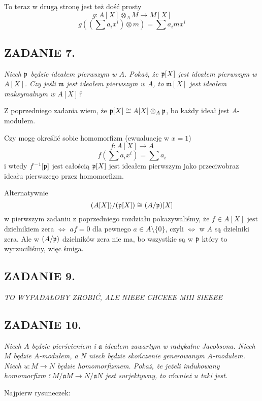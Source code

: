 \documentclass{article}
\begin{document}
To teraz w drugą stronę jest też dość prosty
$$g:A[X]\otimes_AM\to M[X]$$
$$g(\left(\sum a_ix^i\right)\otimes m)=\sum a_imx^i$$

\subsection*{ZADANIE 7.}
{\color{yellow}\emph{Niech $\mathfrak{p}$ będzie ideałem pierwszym w $A$. Pokaż, że $\mathfrak{p}[X]$ jest ideałem pierwszym w $A[X]$. Czy jeśli $\mathfrak{m}$ jest ideałem pierwszym w $A$, to $\mathfrak{m}[X]$ jest ideałem maksymalnym w $A[X]$?}}
\smallskip

Z poprzedniego zadania wiem, że $\mathfrak{p}[X]\cong A[X]\otimes_A\mathfrak{p}$, bo każdy ideał jest $A$-modułem.

Czy mogę określić sobie homomorfizm (ewualuację w $x=1$)
$$f:A[X]\to A$$
$$f(\sum a_ix^i)=\sum a_i$$
i wtedy $f^{-1}[\mathfrak{p}]$ jest całością $\mathfrak{p}[X]$ jest ideałem pierwszym jako przeciwobraz ideału pierwszego przez homomorfizm. 

Alternatywnie
$$(A[X])/(\mathfrak{p}[X])\cong (A/\mathfrak{p})[X]$$
w pierwszym zadaniu z poprzedniego rozdziału pokazywaliśmy, że $f\in A[X]$ jest dzielnikiem zera $\iff$ $af=0$ dla pewnego $a\in A\setminus\{0\}$,
czyli $\iff$ w $A$ są dzielniki zera.
Ale w $(A/\mathfrak{p})$ dzielników zera nie ma, bo wszystkie są w $\mathfrak{p}$ który to wyrzuciliśmy, więc śmiga.

\subsection*{ZADANIE 9.}
\emph{\color{yellow}TO WYPADAŁOBY ZROBIĆ, ALE NIEEE CHCEEE MIII SIEEEE}



\subsection*{ZADANIE 10.}
\emph{\color{blue}Niech $A$ będzie pierścieniem i $\mathfrak{a}$ ideałem zawartym w radykalne Jacobsona. Niech $M$ będzie $A$-modułem, a $N$ niech będzie skończenie generowanym $A$-modułem. Niech $u:M\to N$ będzie homomorfizmem. Pokaż, że jeżeli indukowany homomorfizm $\overline:M/\mathfrak{a}M\to N/\mathfrak{a}N$ jest surjektywny, to również $u$ taki jest.}

Najpierw rysuneczek:

\begin{center}
\end{center}
\end{document}
